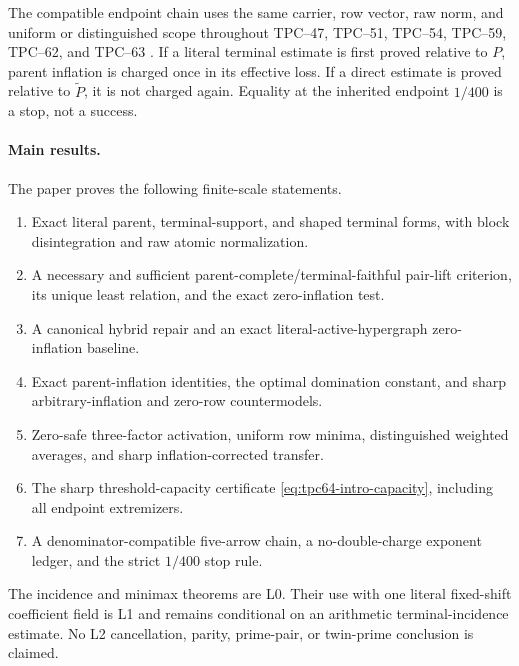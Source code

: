 The compatible endpoint chain uses the same carrier, row vector, raw norm,
and uniform or distinguished scope throughout TPC--47, TPC--51, TPC--54,
TPC--59, TPC--62, and TPC--63
\citep{WangTPC47,WangTPC51,WangTPC54,WangTPC59,WangTPC62,WangTPC63}.
If a literal terminal estimate is first proved relative to \(P\), parent
inflation is charged once in its effective loss.  If a direct estimate is
proved relative to \(\widetilde P\), it is not charged again.  Equality at
the inherited endpoint \(1/400\) is a stop, not a success.

\paragraph{Main results.}
The paper proves the following finite-scale statements.
\begin{enumerate}[label=\textup{(\roman*)},leftmargin=3em]
 \item Exact literal parent, terminal-support, and shaped terminal forms,
       with block disintegration and raw atomic normalization.
 \item A necessary and sufficient parent-complete/terminal-faithful pair-lift
       criterion, its unique least relation, and the exact zero-inflation
       test.
 \item A canonical hybrid repair and an exact literal-active-hypergraph zero-inflation
       baseline.
 \item Exact parent-inflation identities, the optimal domination constant,
       and sharp arbitrary-inflation and zero-row countermodels.
 \item Zero-safe three-factor activation, uniform row minima,
       distinguished weighted averages, and sharp inflation-corrected
       transfer.
 \item The sharp threshold-capacity certificate
       \eqref{eq:tpc64-intro-capacity}, including all endpoint extremizers.
 \item A denominator-compatible five-arrow chain, a no-double-charge
       exponent ledger, and the strict \(1/400\) stop rule.
\end{enumerate}

The incidence and minimax theorems are L0.  Their use with one literal
fixed-shift coefficient field is L1 and remains conditional on an arithmetic
terminal-incidence estimate.  No L2 cancellation, parity, prime-pair, or
twin-prime conclusion is claimed.
